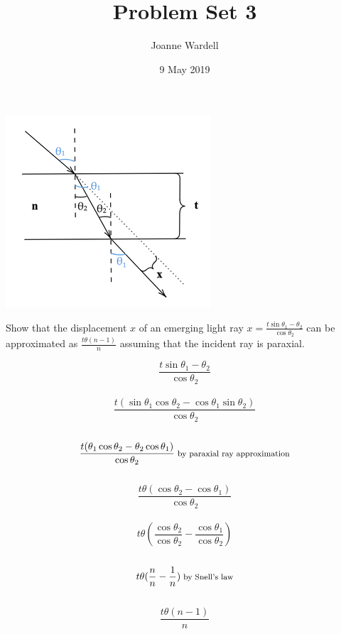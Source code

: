 \documentclass[11pt]{article}
\title{Problem Set 3}
\author{\vspace{-2.0cm}Joanne Wardell}
\date{9 May 2019}
\begin{document}
\maketitle

\begin{center}
\includegraphics{pic2.png}
\end{center}

Show that the displacement $x$ of an emerging light ray
$x = \frac{t\sin{\theta_{1}-\theta_{2}}}{\cos{\theta_{2}}}$
can be approximated as 
$\frac{t\theta(n-1)}{n}$
assuming that the incident ray is paraxial.


\[\frac{t\sin{\theta_{1}-\theta_{2}}}{\cos{\theta_{2}}}\]\\
\[\frac{t(\sin{\theta_{1}}\cos{\theta_{2}}-\cos{\theta_{1}}\sin{\theta_{2}})}{\cos{\theta_{2}}}\]\\
\[\frac{t(\theta_{1}\cos{\theta_{2}}-\theta_{2}\cos{\theta_{1}})}{\cos{\theta_{2}}} \text{\footnotesize{     by paraxial ray approximation}}\]\\
\[\frac{t\theta(\cos{\theta_{2}}-\cos{\theta_{1}})}{\cos{\theta_{2}}}\]\\
\[t\theta(\frac{\cos{\theta_{2}}}{\cos{\theta_{2}}}-\frac{\cos{\theta_{1}}}{\cos{\theta_{2}}})\]\\
\[t\theta(\frac{n}{n}-\frac{1}{n}) \text{\footnotesize{     by Snell's law}}\]\\
\[\frac{t\theta(n-1)}{n}\]
\end{document}
